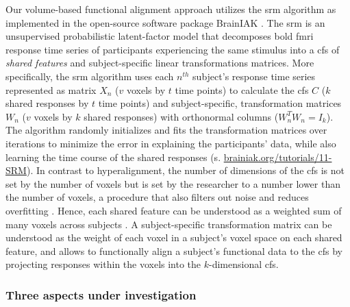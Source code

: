 Our volume-based functional alignment approach utilizes the \ac{srm} algorithm
\citep{chen2015reduced, richard2019fast} as implemented in the open-source
software package BrainIAK \citep[Brain Imaging Analysis Kit;
\href{https://brainiak.org}{\url{brainiak.org}};][]{kumar2020brainiak,
kumar2020brainiaktutorial}.
The \ac{srm} is an unsupervised probabilistic latent-factor model that
decomposes \ac{bold} \ac{fmri} response time series of participants experiencing
the same stimulus into a \ac{cfs} of \textit{shared features} \citep[also called
``\textit{shared feature space}'';][]{chen2015reduced} and subject-specific
linear transformations matrices.
More specifically, the \ac{srm} algorithm uses each $n^{th}$ subject's response
time series represented as matrix $X_{n}$ ({$v$} voxels by $t$ time points) to
calculate the \ac{cfs} $C$ ($k$ shared responses by $t$ time points) and
subject-specific, transformation matrices $W_{n}$ ($v$ voxels by $k$ shared
responses) with orthonormal columns ($W_{n}^{T}W_{n}=I_{k}$).
The algorithm randomly initializes and fits the transformation matrices over
iterations to minimize the error in explaining the participants' data, while
also learning the time course of the shared responses (s.
\href{https://brainiak.org/tutorials/11-SRM/}{\url{brainiak.org/tutorials/11-SRM}}).
In contrast to hyperalignment, the number of dimensions of the \ac{cfs} is not
set by the number of voxels but is set by the researcher to a number lower than
the number of voxels, a procedure that also filters out noise and reduces
overfitting \citep{chen2015reduced}.
Hence, each shared feature can be understood as a weighted sum of many voxels
across subjects \citep{kumar2020brainiak}.
A subject-specific transformation matrix can be understood as the weight of each
voxel in a subject's voxel space on each shared feature, and allows to
functionally align a subject's functional data to the \ac{cfs} by projecting
responses within the voxels into the $k$-dimensional \ac{cfs}.



\subsubsection{Three aspects under investigation}


